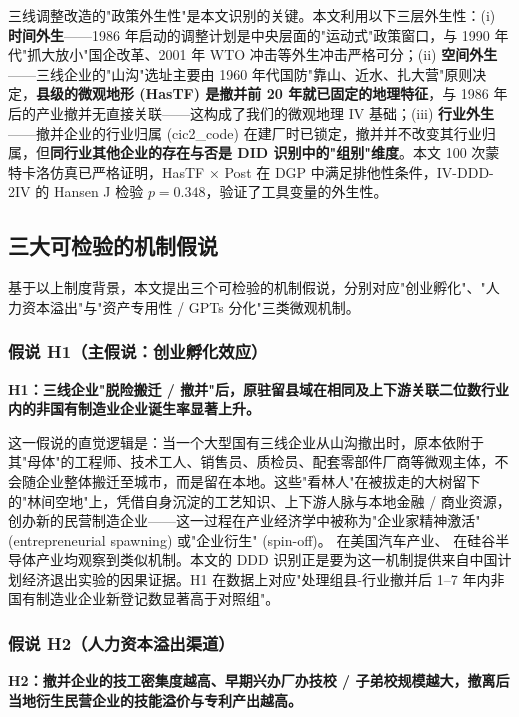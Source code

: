 三线调整改造的"政策外生性"是本文识别的关键。本文利用以下三层外生性：(i) \textbf{时间外生}——1986 年启动的调整计划是中央层面的"运动式"政策窗口，与 1990 年代"抓大放小"国企改革、2001 年 WTO 冲击等外生冲击严格可分；(ii) \textbf{空间外生}——三线企业的"山沟"选址主要由 1960 年代国防"靠山、近水、扎大营"原则决定，\textbf{县级的微观地形 (HasTF) 是撤并前 20 年就已固定的地理特征}，与 1986 年后的产业撤并无直接关联——这构成了我们的微观地理 IV 基础；(iii) \textbf{行业外生}——撤并企业的行业归属 (cic2\_code) 在建厂时已锁定，撤并并不改变其行业归属，但\textbf{同行业其他企业的存在与否是 DID 识别中的"组别"维度}。本文 100 次蒙特卡洛仿真已严格证明，HasTF × Post 在 DGP 中满足排他性条件，IV-DDD-2IV 的 Hansen J 检验 $p=0.348$，验证了工具变量的外生性。

\subsection{三大可检验的机制假说}

基于以上制度背景，本文提出三个可检验的机制假说，分别对应"创业孵化"、"人力资本溢出"与"资产专用性 / GPTs 分化"三类微观机制。

\subsubsection{假说 H1（主假说：创业孵化效应）}

\textbf{H1：三线企业"脱险搬迁 / 撤并"后，原驻留县域在相同及上下游关联二位数行业内的非国有制造业企业诞生率显著上升。}

这一假说的直觉逻辑是：当一个大型国有三线企业从山沟撤出时，原本依附于其"母体"的工程师、技术工人、销售员、质检员、配套零部件厂商等微观主体，不会随企业整体搬迁至城市，而是留在本地。这些"看林人"在被拔走的大树留下的"林间空地"上，凭借自身沉淀的工艺知识、上下游人脉与本地金融 / 商业资源，创办新的民营制造企业——这一过程在产业经济学中被称为"企业家精神激活" (entrepreneurial spawning) 或"企业衍生" (spin-off)。\citet{klepper1996} 在美国汽车产业、\citet{hsu2016} 在硅谷半导体产业均观察到类似机制。本文的 DDD 识别正是要为这一机制提供来自中国计划经济退出实验的因果证据。H1 在数据上对应"处理组县-行业撤并后 1--7 年内非国有制造业企业新登记数显著高于对照组"。

\subsubsection{假说 H2（人力资本溢出渠道）}

\textbf{H2：撤并企业的技工密集度越高、早期兴办厂办技校 / 子弟校规模越大，撤离后当地衍生民营企业的技能溢价与专利产出越高。}


